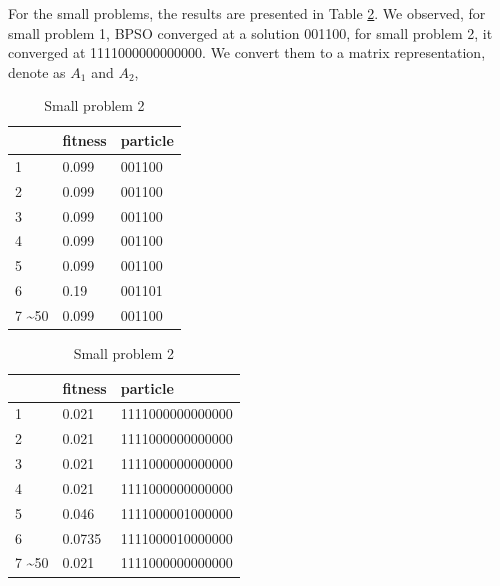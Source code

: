 For the small problems, the results are presented in Table \ref{tab:small}. We observed, for small problem 1, BPSO converged at a solution 001100, 
for small problem 2, it converged at 1111000000000000.
We convert them to a matrix representation, denote as $A_1$ and $A_2$,

\begin{table}[!h]
\footnotesize
\centering
\caption{Small problems}
\begin{subtable}{.4\linewidth}
\centering
\caption{Small problem 1}
\begin{tabular}{|l|l|l|}
\hline
     & fitness & particle \\ \hline
1    & 0.099   & 001100   \\ \hline
2    & 0.099   & 001100   \\ \hline
3    & 0.099   & 001100   \\ \hline
4    & 0.099   & 001100   \\ \hline
5    & 0.099   & 001100   \\ \hline
6    & 0.19    & 001101   \\ \hline
7 \sim 50 & 0.099   & 001100   \\ \hline

\end{tabular}

\end{subtable}
\begin{subtable}{.4\linewidth}
\centering
\caption{Small problem 2}

\begin{tabular}{|l|l|l|}
\hline
     & fitness & particle \\ \hline
1    & 0.021   & 1111000000000000   \\ \hline
2    & 0.021   & 1111000000000000   \\ \hline
3    & 0.021   & 1111000000000000   \\ \hline
4    & 0.021   & 1111000000000000   \\ \hline
5    & 0.046   & 1111000001000000   \\ \hline
6    & 0.0735  & 1111000010000000   \\ \hline
7 \sim 50    & 0.021   & 1111000000000000   \\ \hline
\end{tabular}
\end{subtable}
\label{tab:small}
\end{table}


